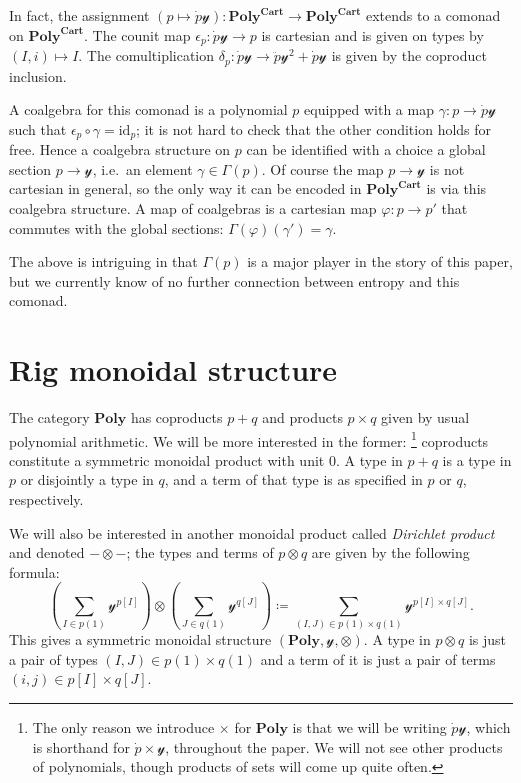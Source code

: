 \documentclass[11pt, one side, article]{memoir}
\theoremstyle{definition}
\theoremstyle{plain}
\newenvironment{remark}
  {\pushQED{\qed}\renewcommand{\qedsymbol}{$\lozenge$}\remarkx}
  {\popQED\endremarkx}
\newcommand{\Cat}[1]{\mathbf{#1}}%
\newcommand{\id}{\mathrm{id}}
\newcommand{\yon}{\mathcal{y}}
\newcommand{\poly}{\Cat{Poly}}
\newcommand{\polycart}{\poly^{\Cat{Cart}}}
\newcommand{\0}{\textsf{0}}
\newcommand{\1}{\tn{\textsf{1}}}
\begin{document}
\begin{remark}
In fact, the assignment $(p\mapsto\dot{p}\yon)\colon\polycart\to\polycart$ extends to a comonad on $\polycart$. The counit map $\epsilon_p\colon\dot{p}\yon\to p$ is cartesian and is given on types by $(I,i)\mapsto I$. The comultiplication $\delta_p\colon\dot{p}\yon\to\ddot{p}\yon^2+\dot{p}\yon$ is given by the coproduct inclusion.

A coalgebra for this comonad is a polynomial $p$ equipped with a map $\gamma\colon p\to\dot{p}\yon$ such that $\epsilon_p\circ\gamma=\id_p$; it is not hard to check that the other condition holds for free. Hence a coalgebra structure on $p$ can be identified with a choice a global section $p\to\yon$, i.e.\ an element $\gamma\in\Gamma(p)$. Of course the map $p\to\yon$ is not cartesian in general, so the only way it can be encoded in $\polycart$ is via this coalgebra structure. A map of coalgebras is a cartesian map $\varphi\colon p\to p'$ that commutes with the global sections: $\Gamma(\varphi)(\gamma')=\gamma$.

The above is intriguing in that $\Gamma(p)$ is a major player in the story of this paper, but we currently know of no further connection between entropy and this comonad. 
\end{remark}

\section{Rig monoidal structure}

The category $\poly$ has coproducts $p+q$ and products $p\times q$ given by usual polynomial arithmetic. We will be more interested in the former:%
\footnote{
The only reason we introduce $\times$ for $\poly$ is that we will be writing $\dot{p}\yon$, which is shorthand for $\dot{p}\times\yon$, throughout the paper. We will not see other products of polynomials, though products of sets will come up quite often.
}
coproducts constitute a symmetric monoidal product with unit $0$. A type in $p+q$ is a type in $p$ or disjointly a type in $q$, and a term of that type is as specified in $p$ or $q$, respectively.

We will also be interested in another monoidal product called \emph{Dirichlet product} and denoted $-\otimes-$; the types and terms of $p\otimes q$ are given by the following formula:
\begin{equation}\label{eqn.dir_formula}
  \left(\sum_{I\in p(1)}\yon^{p[I]}\right)\otimes
  \left(\sum_{J\in q(1)}\yon^{q[J]}\right)\coloneqq
  \sum_{(I,J)\in p(1)\times q(1)}\yon^{p[I]\times q[J]}.
\end{equation}
This gives a symmetric monoidal structure $(\poly,\yon,\otimes)$. A type in $p\otimes q$ is just a pair of types $(I,J)\in p(1)\times q(1)$ and a term of it is just a pair of terms $(i,j)\in p[I]\times q[J]$.
\end{document}
